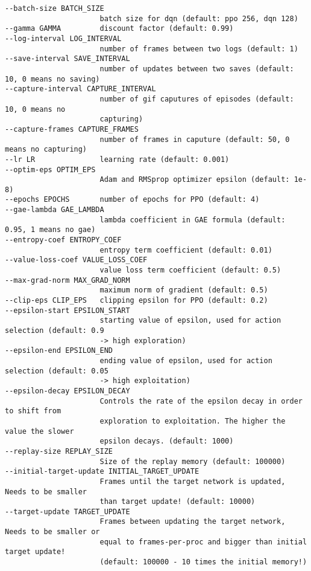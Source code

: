 {\begin{verbatim}
--batch-size BATCH_SIZE
                      batch size for dqn (default: ppo 256, dqn 128)
--gamma GAMMA         discount factor (default: 0.99)
--log-interval LOG_INTERVAL
                      number of frames between two logs (default: 1)
--save-interval SAVE_INTERVAL
                      number of updates between two saves (default: 10, 0 means no saving)
--capture-interval CAPTURE_INTERVAL
                      number of gif caputures of episodes (default: 10, 0 means no 
                      capturing)
--capture-frames CAPTURE_FRAMES
                      number of frames in caputure (default: 50, 0 means no capturing)
--lr LR               learning rate (default: 0.001)
--optim-eps OPTIM_EPS
                      Adam and RMSprop optimizer epsilon (default: 1e-8)
--epochs EPOCHS       number of epochs for PPO (default: 4)
--gae-lambda GAE_LAMBDA
                      lambda coefficient in GAE formula (default: 0.95, 1 means no gae)
--entropy-coef ENTROPY_COEF
                      entropy term coefficient (default: 0.01)
--value-loss-coef VALUE_LOSS_COEF
                      value loss term coefficient (default: 0.5)
--max-grad-norm MAX_GRAD_NORM
                      maximum norm of gradient (default: 0.5)
--clip-eps CLIP_EPS   clipping epsilon for PPO (default: 0.2)
--epsilon-start EPSILON_START
                      starting value of epsilon, used for action selection (default: 0.9 
                      -> high exploration)
--epsilon-end EPSILON_END
                      ending value of epsilon, used for action selection (default: 0.05 
                      -> high exploitation)
--epsilon-decay EPSILON_DECAY
                      Controls the rate of the epsilon decay in order to shift from 
                      exploration to exploitation. The higher the value the slower 
                      epsilon decays. (default: 1000)
--replay-size REPLAY_SIZE
                      Size of the replay memory (default: 100000)
--initial-target-update INITIAL_TARGET_UPDATE
                      Frames until the target network is updated, Needs to be smaller 
                      than target update! (default: 10000)
--target-update TARGET_UPDATE
                      Frames between updating the target network, Needs to be smaller or 
                      equal to frames-per-proc and bigger than initial target update! 
                      (default: 100000 - 10 times the initial memory!)
    \end{verbatim}
}
